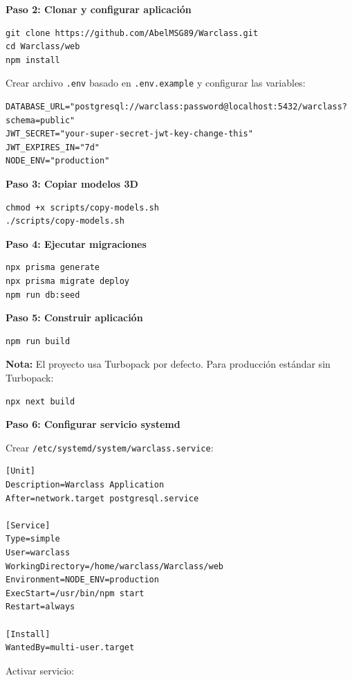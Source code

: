 \textbf{Paso 2: Clonar y configurar aplicación}

\begin{verbatim}
git clone https://github.com/AbelMSG89/Warclass.git
cd Warclass/web
npm install
\end{verbatim}

Crear archivo \texttt{.env} basado en \texttt{.env.example} y configurar las variables:

\begin{verbatim}
DATABASE_URL="postgresql://warclass:password@localhost:5432/warclass?schema=public"
JWT_SECRET="your-super-secret-jwt-key-change-this"
JWT_EXPIRES_IN="7d"
NODE_ENV="production"
\end{verbatim}

\textbf{Paso 3: Copiar modelos 3D}

\begin{verbatim}
chmod +x scripts/copy-models.sh
./scripts/copy-models.sh
\end{verbatim}

\textbf{Paso 4: Ejecutar migraciones}

\begin{verbatim}
npx prisma generate
npx prisma migrate deploy
npm run db:seed
\end{verbatim}

\textbf{Paso 5: Construir aplicación}

\begin{verbatim}
npm run build
\end{verbatim}

\textbf{Nota:} El proyecto usa Turbopack por defecto. Para producción estándar sin Turbopack:

\begin{verbatim}
npx next build
\end{verbatim}

\textbf{Paso 6: Configurar servicio systemd}

Crear \texttt{/etc/systemd/system/warclass.service}:

\begin{verbatim}
[Unit]
Description=Warclass Application
After=network.target postgresql.service

[Service]
Type=simple
User=warclass
WorkingDirectory=/home/warclass/Warclass/web
Environment=NODE_ENV=production
ExecStart=/usr/bin/npm start
Restart=always

[Install]
WantedBy=multi-user.target
\end{verbatim}

Activar servicio:

